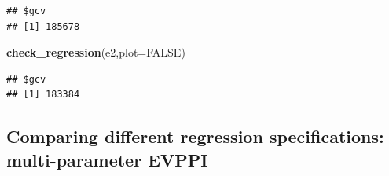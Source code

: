\documentclass[
]{article}
\newenvironment{Shaded}{\begin{snugshade}}{\end{snugshade}}
\newcommand{\AttributeTok}[1]{\textcolor[rgb]{0.13,0.29,0.53}{#1}}
\newcommand{\ConstantTok}[1]{\textcolor[rgb]{0.56,0.35,0.01}{#1}}
\newcommand{\FunctionTok}[1]{\textcolor[rgb]{0.13,0.29,0.53}{\textbf{#1}}}
\newcommand{\NormalTok}[1]{#1}
\begin{document}
\begin{verbatim}
## $gcv
## [1] 185678
\end{verbatim}

\begin{Shaded}
\begin{Highlighting}[]
\FunctionTok{check\_regression}\NormalTok{(e2,}\AttributeTok{plot=}\ConstantTok{FALSE}\NormalTok{)}
\end{Highlighting}
\end{Shaded}

\begin{verbatim}
## $gcv
## [1] 183384
\end{verbatim}

\hypertarget{comparing-different-regression-specifications-multi-parameter-evppi}{%
\subsection{Comparing different regression specifications:
multi-parameter
EVPPI}\label{comparing-different-regression-specifications-multi-parameter-evppi}}
\end{document}
